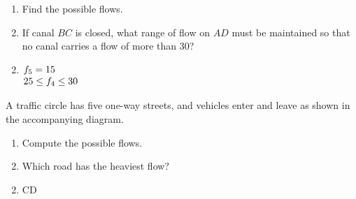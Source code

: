 \begin{multicols}{2}
\begin{ex}
\begin{figure}[H]
\centering

\end{figure}

\begin{enumerate}[label={\alph*.}]
\item Find the possible flows.

\item If canal $BC$ is closed, what range of flow on $AD$ must be maintained so that no canal carries a flow of more than 30?

\end{enumerate}
\begin{sol}
\begin{enumerate}[label={\alph*.}]
\setcounter{enumi}{1}
\item  
$\arraycolsep=1pt
\begin{array}[t]{l}
	f_5 = 15 \\
	25 \leq f_4 \leq 30
\end{array}$

\end{enumerate}
\end{sol}
\end{ex}

\begin{ex}
A traffic circle has five one-way streets, and vehicles enter and leave as shown in the accompanying diagram.

\begin{figure}[H]
\centering

\end{figure}

\begin{enumerate}[label={\alph*.}]
\item Compute the possible flows.

\item Which road has the heaviest flow?

\end{enumerate}
\begin{sol}
\begin{enumerate}[label={\alph*.}]
\setcounter{enumi}{1}
\item CD
\end{enumerate}
\end{sol}
\end{ex}


\end{multicols}

